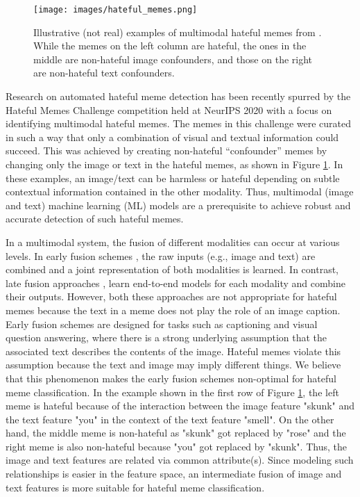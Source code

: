 \documentclass[11pt]{article}
\begin{document}
\begin{figure}[t]
\centering
   \texttt{[image: images/hateful\_memes.png]}
   \caption{Illustrative (not real) examples of multimodal hateful memes from \citet{kiela2020hateful}. While the memes on the left column are hateful, the ones in the middle are non-hateful image confounders, and those on the right are non-hateful text confounders.}
   \label{fig:example}
\end{figure}

Research on automated hateful meme detection has been recently spurred by the Hateful Memes Challenge competition \citep{kiela2020hateful} held at NeurIPS 2020 with a focus on identifying multimodal hateful memes. The memes in this challenge were curated in such a way that only a combination of visual and textual information could succeed. This was achieved by creating non-hateful ``confounder'' memes by changing only the image or text in the hateful memes, as shown in Figure \ref{fig:example}. In these examples, an image/text can be harmless or hateful depending on subtle contextual information contained in the other modality. Thus, multimodal (image and text) machine learning (ML) models are a prerequisite to achieve robust and accurate detection of such hateful memes.

In a multimodal system, the fusion of different modalities can occur at various levels. In early fusion schemes \cite{kiela2019supervised, lu2019vilbert,li2019visualbert}, the raw inputs (e.g., image and text) are combined and a joint representation of both modalities is learned. In contrast, late fusion approaches \cite{kiela2020hateful}, learn end-to-end models for each modality and combine their outputs. However, both these approaches are not appropriate for hateful memes because the text in a meme does not play the role of an image caption. Early fusion schemes are designed for tasks such as captioning and visual question answering, where there is a strong underlying assumption that the associated text describes the contents of the image. Hateful memes violate this assumption because the text and image may imply different things. We believe that this phenomenon makes the early fusion schemes non-optimal for hateful meme classification. In the example shown in the first row of Figure \ref{fig:example}, the left meme is hateful because of the interaction between the image feature "skunk" and the text feature "you" in the context of the text feature "smell". On the other hand, the middle meme is non-hateful as "skunk" got replaced by "rose" and the right meme is also non-hateful because "you" got replaced by "skunk". Thus, the image and text features are related via common attribute(s). Since modeling such relationships is easier in the feature space, an intermediate fusion of image and text features is more suitable for hateful meme classification.  
\end{document}
